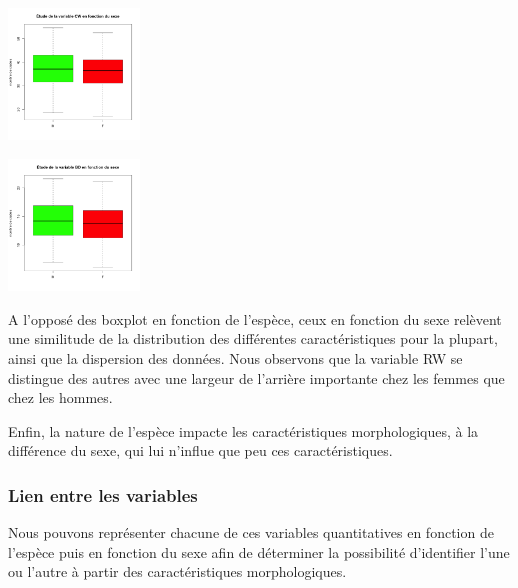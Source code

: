 \documentclass[10pt]{article}
\begin{document}
\begin{center}
\begin{minipage}[t]{0.4\textwidth}
			\includegraphics[width=35mm]{Figures/Crabs/bxp_sex_cw.png}	
		\end{minipage}
		\begin{minipage}[t]{0.4\textwidth}
			\includegraphics[width=35mm]{Figures/Crabs/bxp_sex_bd.png}
		\end{minipage}
	\end{center}
	
	A l'opposé des boxplot en fonction de l'espèce, ceux en fonction du sexe relèvent une similitude de la distribution des différentes caractéristiques pour la plupart, ainsi que la dispersion des données. Nous observons que la variable RW se distingue des autres avec une largeur de l'arrière importante chez les femmes que chez les hommes.
	
	Enfin, la nature de l'espèce impacte les caractéristiques morphologiques, à la différence du sexe, qui lui n'influe que peu ces caractéristiques.
	
	\subsubsection{Lien entre les variables}
	Nous pouvons représenter chacune de ces variables quantitatives en fonction de l'espèce puis en fonction du sexe afin de déterminer la possibilité d'identifier l'une ou l'autre à partir des caractéristiques morphologiques. \\
	
\end{document}
